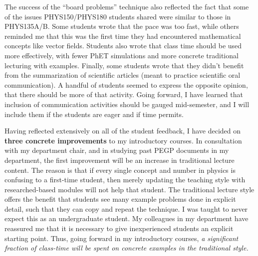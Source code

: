 \documentclass[../../main.tex]{subfiles}
\begin{document}
The success of the ``board problems'' technique also reflected the fact that some of the issues PHYS150/PHYS180 students shared were similar to those in PHYS135A/B.  Some students wrote that the pace was too fast, while others reminded me that this was the first time they had encountered mathematical concepts like vector fields.  Students also wrote that class time should be used more effectively, with fewer PhET simulations and more concrete traditional lecturing with examples.  Finally, some students wrote that they didn't benefit from the summarization of scientific articles (meant to practice scientific oral communication).  A handful of students seemed to express the opposite opinion, that there should be more of that activity.  Going forward, I have learned that inclusion of communication activities should be gauged mid-semester, and I will include them if the students are eager and if time permits.

Having reflected extensively on all of the student feedback, I have decided on \textbf{three concrete improvements} to my introductory courses.  In consultation with my department chair, and in studying past PEGP documents in my department, the first improvement will be an increase in traditional lecture content.  The reason is that if every single concept and number in physics is confusing to a first-time student, then merely updating the teaching style with researched-based modules will not help that student.  The traditional lecture style offers the benefit that students see many example problems done in explicit detail, such that they can copy and repeat the technique.  I was taught to never expect this as an undergraduate student.  My colleagues in my department have reassured me that it is necessary to give inexperienced students an explicit starting point.  Thus, going forward in my introductory courses, \textit{a significant fraction of class-time will be spent on concrete examples in the traditional style.} \\ \hspace{0.1cm}
\end{document}

